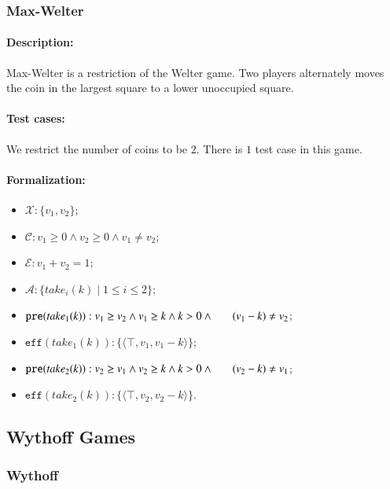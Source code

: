 \documentclass[review]{elsarticle}
\newcommand{\set}[1]{\{ #1 \}}
\newcommand{\tuple}[1]{\langle {#1} \rangle}
\newcommand{\true}{\top}
\newcommand{\statevar}{\mathcal{X}}
\newcommand{\act}{\mathcal{A}}
\newcommand{\constraint}{\mathcal{C}}
\newcommand{\estate}{\mathcal{E}}
\newcommand{\pre}{\mathtt{pre}}
\newcommand{\eff}{\mathtt{eff}}
\begin{document}
\subsubsection{Max-Welter \protect\cite{Ho2014}}

\paragraph{Description:} 
Max-Welter is a restriction of the Welter game.
Two players alternately moves the coin in the largest square to a lower unoccupied square. 

\paragraph{Test cases:}
We restrict the number of coins to be $2$. 
There is $1$ test case in this game.

\paragraph{Formalization:}

\begin{itemize}
	\item $\statevar: \set{v_1, v_2}$;
	\item $\constraint: v_1 \ge 0 \wedge v_2 \ge 0 \wedge v_1 \neq v_2$;
	\item $\estate:  v_1 + v_2  =1 $;
	\item $\act:\set{take_i(k){\mid}1\le i \le2}$;
	\item $\pre(take_1(k)) : v_1 \ge v_2 \wedge v_1 \ge k \wedge k > 0 \wedge \\ \hspace*{6mm}
	(v_1-k) \neq v_2$;
	\item $\eff(take_1(k)) : \set{\tuple{\true,  v_1,  v_1 - k}}$;
	\item $\pre(take_2(k)) :  v_2 \ge v_1 \wedge v_2 \ge k \wedge k > 0 \wedge \\ \hspace*{6mm}
	(v_2-k) \neq v_1 $;
	\item $\eff(take_2(k)) : \set{\tuple{\true,  v_2,  v_2 - k}}$.
\end{itemize}

\subsection{Wythoff Games}



\subsubsection{Wythoff \protect\cite{Wyt1907}}
\end{document}
